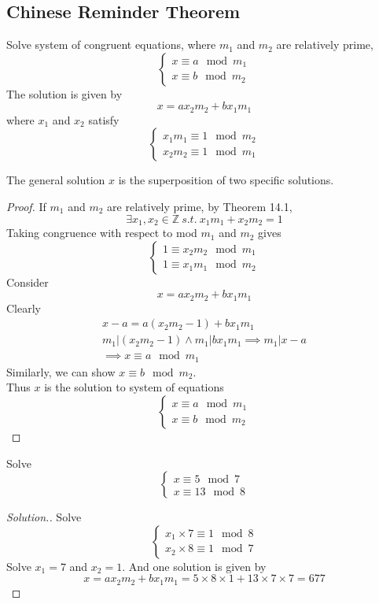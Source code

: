 \documentclass[10pt]{article}
\begin{document}
		\subsection{Chinese Reminder Theorem}
		\begin{theorem}
			Solve system of congruent equations, where $m_1$ and $m_2$ are relatively prime, 
			\[
				\begin{cases}
					x \equiv a \mod m_1 \\
					x \equiv b \mod m_2
				\end{cases}
			\]
			The solution is given by 
			\[
				x = a x_2 m_2 + b x_1 m_1
			\]
			where $x_1$ and $x_2$ satisfy
			\[
				\begin{cases}
					x_1 m_1 \equiv 1 \mod m_2 \\
					x_2 m_2 \equiv 1 \mod m_1 
				\end{cases}
			\]
		\end{theorem}
		The general solution $x$ is the superposition of two specific solutions.
		
		\begin{proof}
			If $m_1$ and $m_2$ are relatively prime, by Theorem 14.1,
			\[
				\exists x_1, x_2 \in \mathbb{Z}\ s.t. \ x_1 m_1 + x_2 m_2 = 1
			\]
			Taking congruence with respect to mod $m_1$ and $m_2$ gives
			\[
				\begin{cases}
					1 \equiv x_2 m_2 \mod m_1 \\
					1 \equiv x_1 m_1 \mod m_2
				\end{cases}
			\]
			Consider 
			\[
				x = a x_2 m_2 + b x_1 m_1
			\]
			Clearly 
			\begin{gather*}
				x - a = a(x_2 m_2 - 1) + b x_1 m_1 \\
				m_1 | (x_2 m_2 - 1) \land m_1 | b x_1 m_1 \implies m_1 | x - a \\
				\implies x \equiv a \mod m_1
			\end{gather*}
			Similarly, we can show $x \equiv b \mod m_2$. \\
			Thus $x$ is the solution to system of equations 
			\[
				\begin{cases}
					x \equiv a \mod m_1 \\
					x \equiv b \mod m_2
				\end{cases}
			\]
		\end{proof}
		
		\begin{example}
			Solve
			\[
				\begin{cases}
					x \equiv 5 \mod 7 \\
					x \equiv 13 \mod 8
				\end{cases}
			\]
		\end{example}
		\begin{proof}[Solution.]
			Solve 
			\[
				\begin{cases}
					x_1 \times 7 \equiv 1 \mod 8 \\
					x_2 \times 8 \equiv 1 \mod 7
				\end{cases}
			\]
			Solve $x_1 = 7$ and $x_2 = 1$. And one solution is given by 
			\[
				x = a x_2 m_2 + b x_1 m_1 = 5 \times 8 \times 1 + 13 \times 7 \times 7 = 677
			\]
		\end{proof}
\end{document}
